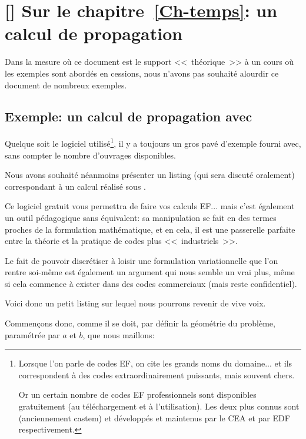 \ifVersionAvecExemplesSepares
   \chapter{[\freefem] Sur le chapitre~\ref{Ch-temps}: un calcul de propagation}

   Dans la mesure où ce document est le support <<~théorique~>> à un cours
   où les exemples sont abordés en cessions, nous n'avons pas souhaité alourdir
   ce document de nombreux exemples.
\else
   \section{Exemple: un calcul de propagation avec \freefem}
\fi


\medskip
Quelque soit le logiciel utilisé\footnote{%
Lorsque l'on parle de codes EF, on cite les grands noms du domaine... et ils correspondent à des
codes extraordinairement puissants, mais souvent chers.

Or un certain nombre de codes EF professionnels sont disponibles gratuitement (au téléchargement
et à l'utilisation).
Les deux plus connus sont \castem (anciennement castem) et \aster développés et maintenus
par le CEA et par EDF respectivement.%
}, il y a toujours un gros pavé d'exemple fourni avec,
sans compter le nombre d'ouvrages disponibles.

\medskip
Nous avons souhaité néanmoins présenter un listing (qui sera discuté oralement)
correspondant à un calcul réalisé sous \freefem.

Ce logiciel gratuit vous permettra de faire vos calculs EF... mais c'est également un outil 
pédagogique sans équivalent: sa manipulation se fait en des termes proches de la
formulation mathématique, et en cela, il est une passerelle parfaite entre la théorie
et la pratique de codes plus <<~industriels~>>.

Le fait de pouvoir discrétiser à loisir une formulation variationnelle que l'on rentre
soi-même est également un argument qui nous semble un vrai plus, même si
cela commence à exister dans des codes commerciaux (mais reste confidentiel).

\medskip
Voici donc un petit listing sur lequel nous pourrons revenir de vive voix.

Commençons donc, comme il se doit, par définir la géométrie du problème, paramétrée
par $a$ et $b$, que nous maillons:

